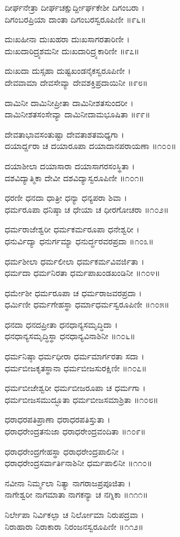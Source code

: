 ದೀರ್ಘನೇತ್ರಾ ದೀರ್ಘಚಕ್ಷುರ್ದ್ದೀರ್ಘಕೇಶೀ ದಿಗಂಬರಾ ।\\
ದಿಗಂಬರಪ್ರಿಯಾ ದಾಂತಾ ದಿಗಂಬರಸ್ವರೂಪಿಣೀ ॥೯೬॥

ದುಃಖಹೀನಾ ದುಃಖಹರಾ ದುಃಖಸಾಗರತಾರಿಣೀ ।\\
ದುಃಖದಾರಿದ್ರ್ಯಶಮನೀ ದುಃಖದಾರಿದ್ರ್ಯಕಾರಿಣೀ ॥೯೭॥

ದುಃಖದಾ ದುಸ್ಸಹಾ ದುಷ್ಟಖಂಡನೈಕಸ್ವರೂಪಿಣೀ ।\\
ದೇವವಾಮಾ ದೇವಸೇವ್ಯಾ ದೇವಶಕ್ತಿಪ್ರದಾಯಿನೀ ॥೯೮॥

ದಾಮಿನೀ ದಾಮಿನೀಪ್ರೀತಾ ದಾಮಿನೀಶತಸುಂದರೀ ।\\
ದಾಮಿನೀಶತಸಂಸೇವ್ಯಾ ದಾಮಿನೀದಾಮಭೂಷಿತಾ ॥೯೯॥

ದೇವತಾಭಾವಸಂತುಷ್ಟಾ ದೇವತಾಶತಮಧ್ಯಗಾ ।\\
ದಯಾರ್ದ್ದರಾ ಚ ದಯಾರೂಪಾ ದಯಾದಾನಪರಾಯಣಾ ॥೧೦೦॥

ದಯಾಶೀಲಾ ದಯಾಸಾರಾ ದಯಾಸಾಗರಸಂಸ್ಥಿತಾ ।\\
ದಶವಿದ್ಯಾತ್ಮಿಕಾ ದೇವೀ ದಶವಿದ್ಯಾಸ್ವರೂಪಿಣೀ ॥೧೦೧॥

ಧರಣೀ ಧನದಾ ಧಾತ್ರೀ ಧನ್ಯಾ ಧನ್ಯಪರಾ ಶಿವಾ ।\\
ಧರ್ಮರೂಪಾ ಧನಿಷ್ಠಾ ಚ ಧೇಯಾ ಚ ಧೀರಗೋಚರಾ ॥೧೦೨॥

ಧರ್ಮರಾಜೇಶ್ವರೀ ಧರ್ಮಕರ್ಮರೂಪಾ ಧನೇಶ್ವರೀ ।\\
ಧನುರ್ವಿದ್ಯಾ ಧನುರ್ಗಮ್ಯಾ ಧನುರ್ದ್ಧರವರಪ್ರದಾ ॥೧೦೩॥

ಧರ್ಮಶೀಲಾ ಧರ್ಮಲೀಲಾ ಧರ್ಮಕರ್ಮವಿವರ್ಜಿತಾ ।\\
ಧರ್ಮದಾ ಧರ್ಮನಿರತಾ ಧರ್ಮಪಾಖಂಡಖಂಡಿನೀ ॥೧೦೪॥

ಧರ್ಮೇಶೀ ಧರ್ಮರೂಪಾ ಚ ಧರ್ಮರಾಜವರಪ್ರದಾ ।\\
ಧರ್ಮಿಣೀ ಧರ್ಮಗೇಹಸ್ಥಾ ಧರ್ಮಾಧರ್ಮಸ್ವರೂಪಿಣೀ ॥೧೦೫॥

ಧನದಾ ಧನದಪ್ರೀತಾ ಧನಧಾನ್ಯಸಮೃದ್ಧಿದಾ ।\\
ಧನಧಾನ್ಯಸಮೃದ್ಧಿಸ್ಥಾ ಧನಧಾನ್ಯವಿನಾಶಿನೀ ॥೧೦೬॥

ಧರ್ಮನಿಷ್ಠಾ ಧರ್ಮಧೀರಾ ಧರ್ಮಮಾರ್ಗರತಾ ಸದಾ ।\\
ಧರ್ಮಬೀಜಕೃತಸ್ಥಾನಾ ಧರ್ಮಬೀಜಸುರಕ್ಷಿಣೀ ॥೧೦೭॥

ಧರ್ಮಬೀಜೇಶ್ವರೀ ಧರ್ಮಬೀಜರೂಪಾ ಚ ಧರ್ಮಗಾ ।\\
ಧರ್ಮಬೀಜಸಮುದ್ಭೂತಾ ಧರ್ಮಬೀಜಸಮಾಶ್ರಿತಾ ॥೧೦೮॥

ಧರಾಧರಪತಿಪ್ರಾಣಾ ಧರಾಧರಪತಿಸ್ತುತಾ ।\\
ಧರಾಧರೇಂದ್ರತನುಜಾ ಧರಾಧರೇಂದ್ರವಂದಿತಾ ॥೧೦೯॥

ಧರಾಧರೇಂದ್ರಗೇಹಸ್ಥಾ ಧರಾಧರೇಂದ್ರಪಾಲಿನೀ ।\\
ಧರಾಧರೇಂದ್ರಸರ್ವಾರ್ತಿನಾಶಿನೀ ಧರ್ಮಪಾಲಿನೀ ॥೧೧೦॥

ನವೀನಾ ನಿರ್ಮ್ಮಲಾ ನಿತ್ಯಾ ನಾಗರಾಜಪ್ರಪೂಜಿತಾ ।\\
ನಾಗೇಶ್ವರೀ ನಾಗಮಾತಾ ನಾಗಕನ್ಯಾ ಚ ನಗ್ನಿಕಾ ॥೧೧೧॥

ನಿರ್ಲೇಪಾ ನಿರ್ವಿಕಲ್ಪಾ ಚ ನಿರ್ಲೋಮಾ ನಿರುಪದ್ರವಾ ।\\
ನಿರಾಹಾರಾ ನಿರಾಕಾರಾ ನಿರಂಜನಸ್ವರೂಪಿಣೀ ॥೧೧೨॥

